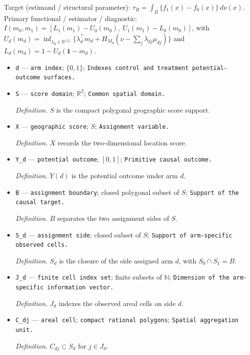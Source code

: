 \documentclass{article}
\begin{document}
Target (estimand / structural parameter): \(\tau_B=\int_B\{f_1(x)-f_0(x)\}\,d\nu(x)\).
Primary functional / estimator / diagnostic: \(I(m_0,m_1)=[L_1(m_1)-U_0(m_0),\ U_1(m_1)-L_0(m_0)]\), with \(U_d(m_d)=\inf_{\lambda_d\in\mathbb R^{|J_d|}}\{\lambda_d^\top m_d+H_{M_d}(\nu-\sum_j\lambda_{dj}\mu_{dj})\}\) and \(L_d(m_d)=1-U_d(\mathbf 1-m_d)\).
\begin{itemize}
  \item \texttt{d} --- \texttt{arm index}; \(\{0,1\}\); \texttt{Indexes control and treatment potential-\allowbreak{}outcome surfaces.}
  \item \texttt{S} --- \texttt{score domain}; \(\mathbb R^2\); \texttt{Common spatial domain.}
  \par\smallskip\noindent\emph{Definition.} \(S\) is the compact polygonal geographic score support.
  \item \texttt{X} --- \texttt{geographic score}; \(S\); \texttt{Assignment variable.}
  \par\smallskip\noindent\emph{Definition.} \(X\) records the two-dimensional location score.
  \item \texttt{Y\_\allowbreak{}d} --- \texttt{potential outcome}; \([0,1]\); \texttt{Primitive causal outcome.}
  \par\smallskip\noindent\emph{Definition.} \(Y(d)\) is the potential outcome under arm \(d\).
  \item \texttt{B} --- \texttt{assignment boundary}; closed polygonal subset of \(S\); \texttt{Support of the causal target.}
  \par\smallskip\noindent\emph{Definition.} \(B\) separates the two assignment sides of \(S\).
  \item \texttt{S\_\allowbreak{}d} --- \texttt{assignment side}; closed subset of \(S\); \texttt{Support of arm-\allowbreak{}specific observed cells.}
  \par\smallskip\noindent\emph{Definition.} \(S_d\) is the closure of the side assigned arm \(d\), with \(S_0\cap S_1=B\).
  \item \texttt{J\_\allowbreak{}d} --- \texttt{finite cell index set}; finite subsets of \(\mathbb N\); \texttt{Dimension of the arm-\allowbreak{}specific information vector.}
  \par\smallskip\noindent\emph{Definition.} \(J_d\) indexes the observed areal cells on side \(d\).
  \item \texttt{C\_\allowbreak{}dj} --- \texttt{areal cell}; \texttt{compact rational polygons}; \texttt{Spatial aggregation unit.}
  \par\smallskip\noindent\emph{Definition.} \(C_{dj}\subset S_d\) for \(j\in J_d\).

\end{itemize}
\end{document}
